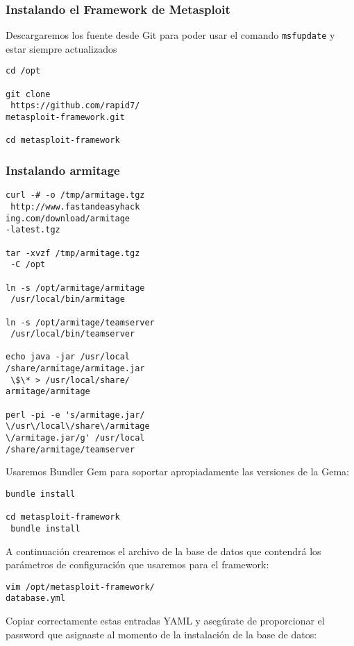 \documentclass[12pt,twocolumn]{report}
\begin{document}
\subsubsection{Instalando el Framework de Metasploit}

Descargaremos los fuente desde Git para poder usar el comando \texttt{msfupdate} y estar siempre actualizados

\begin{lstlisting}
cd /opt

git clone
 https://github.com/rapid7/
metasploit-framework.git

cd metasploit-framework
\end{lstlisting}

\subsubsection{Instalando armitage}
\begin{lstlisting}
curl -# -o /tmp/armitage.tgz
 http://www.fastandeasyhack
ing.com/download/armitage
-latest.tgz

tar -xvzf /tmp/armitage.tgz
 -C /opt

ln -s /opt/armitage/armitage
 /usr/local/bin/armitage

ln -s /opt/armitage/teamserver
 /usr/local/bin/teamserver

echo java -jar /usr/local
/share/armitage/armitage.jar
 \$\* > /usr/local/share/
armitage/armitage

perl -pi -e 's/armitage.jar/
\/usr\/local\/share\/armitage
\/armitage.jar/g' /usr/local
/share/armitage/teamserver
\end{lstlisting}

Usaremos Bundler Gem para soportar apropiadamente las versiones de la Gema:

\begin{lstlisting}
bundle install

cd metasploit-framework
 bundle install
\end{lstlisting}


A continuación crearemos el archivo de la base de datos que contendrá los parámetros de configuración que usaremos para el 
framework:

\begin{lstlisting}
vim /opt/metasploit-framework/
database.yml
\end{lstlisting}


Copiar correctamente estas entradas YAML y asegúrate de proporcionar el password que asignaste al momento de la instalación de la 
base de datos:
\end{document}
